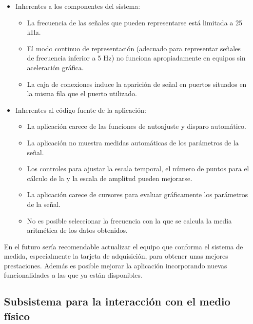 \begin{itemize}
    \item Inherentes a los componentes del sistema:
	\begin{itemize}
	    \item La frecuencia de las señales que pueden representarse
		está limitada a 25 kHz.
	    \item El modo continuo de representación (adecuado para
		representar señales de frecuencia inferior a 5 Hz) no
		funciona apropiadamente en equipos sin aceleración gráfica.
	    \item La caja de conexiones induce la aparición de señal en
		puertos situados en la misma fila que el puerto utilizado.
	\end{itemize}
    \item Inherentes al código fuente de la aplicación:
	\begin{itemize}
	    \item La aplicación carece de las funciones de autoajuste y
		disparo automático.
	    \item La aplicación no muestra medidas automáticas de los
		parámetros de la señal.
	    \item Los controles para ajustar la escala temporal, el número
		de puntos para el cálculo de la  y la escala de
		amplitud pueden mejorarse.
	    \item La aplicación carece de cursores para evaluar
		gráficamente los parámetros de la señal.
	    \item No es posible seleccionar la frecuencia con la que se
		calcula la media aritmética de los datos obtenidos.
	\end{itemize}
\end{itemize}

En el futuro sería recomendable actualizar el equipo que conforma el
sistema de medida, especialmente la tarjeta de adquisición, para obtener
unas mejores prestaciones. Además es posible mejorar la aplicación
incorporando nuevas funcionalidades a las que ya están disponibles.


\subsection{Subsistema para la interacción con el medio
físico}\label{subsec:transducerconclusions}

